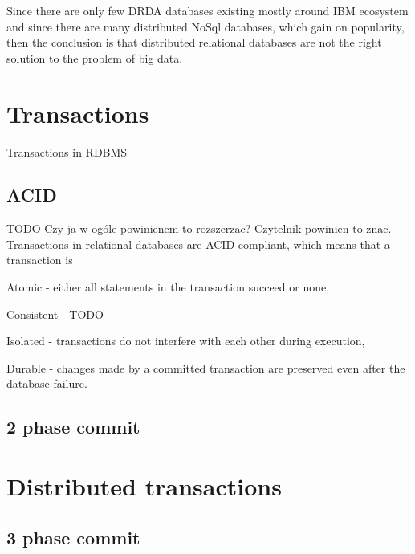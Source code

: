 Since there are only few DRDA databases existing mostly around IBM ecosystem and since there are many distributed NoSql databases, which gain on popularity, then the conclusion is that distributed relational databases are not the right solution to the problem of big data.

\section{Transactions}\label{sec:theory:transactions}
Transactions in RDBMS

\subsection{ACID}
TODO Czy ja w ogóle powinienem to rozszerzac? Czytelnik powinien to znac.
Transactions in relational databases are ACID compliant, which means that a transaction is \begin{enumerate*} 
\item Atomic - either all statements in the transaction succeed or none,
\item Consistent - TODO
\item Isolated - transactions do not interfere with each other during execution,
\item Durable - changes made by a committed transaction are preserved even after the database failure.
\end{enumerate*}

\subsection{2 phase commit}

\section{Distributed transactions}


\subsection{3 phase commit}\label{sec:theory:transactions:3pc}

